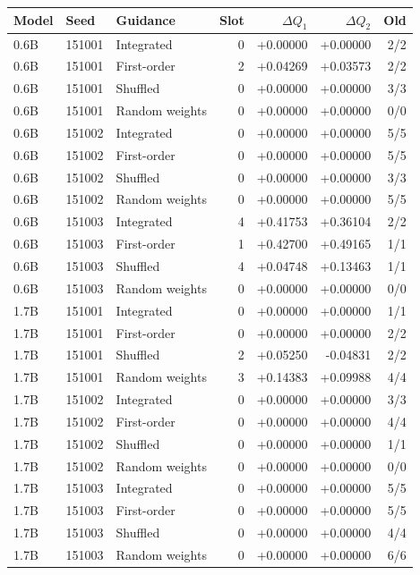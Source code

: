 \begin{tabular}{lllrrrr}
\toprule
Model & Seed & Guidance & Slot & $\Delta Q_1$ & $\Delta Q_2$ & Old \\
\midrule
0.6B & 151001 & Integrated & 0 & +0.00000 & +0.00000 & 2/2 \\
0.6B & 151001 & First-order & 2 & +0.04269 & +0.03573 & 2/2 \\
0.6B & 151001 & Shuffled & 0 & +0.00000 & +0.00000 & 3/3 \\
0.6B & 151001 & Random weights & 0 & +0.00000 & +0.00000 & 0/0 \\
0.6B & 151002 & Integrated & 0 & +0.00000 & +0.00000 & 5/5 \\
0.6B & 151002 & First-order & 0 & +0.00000 & +0.00000 & 5/5 \\
0.6B & 151002 & Shuffled & 0 & +0.00000 & +0.00000 & 3/3 \\
0.6B & 151002 & Random weights & 0 & +0.00000 & +0.00000 & 5/5 \\
0.6B & 151003 & Integrated & 4 & +0.41753 & +0.36104 & 2/2 \\
0.6B & 151003 & First-order & 1 & +0.42700 & +0.49165 & 1/1 \\
0.6B & 151003 & Shuffled & 4 & +0.04748 & +0.13463 & 1/1 \\
0.6B & 151003 & Random weights & 0 & +0.00000 & +0.00000 & 0/0 \\
1.7B & 151001 & Integrated & 0 & +0.00000 & +0.00000 & 1/1 \\
1.7B & 151001 & First-order & 0 & +0.00000 & +0.00000 & 2/2 \\
1.7B & 151001 & Shuffled & 2 & +0.05250 & -0.04831 & 2/2 \\
1.7B & 151001 & Random weights & 3 & +0.14383 & +0.09988 & 4/4 \\
1.7B & 151002 & Integrated & 0 & +0.00000 & +0.00000 & 3/3 \\
1.7B & 151002 & First-order & 0 & +0.00000 & +0.00000 & 4/4 \\
1.7B & 151002 & Shuffled & 0 & +0.00000 & +0.00000 & 1/1 \\
1.7B & 151002 & Random weights & 0 & +0.00000 & +0.00000 & 0/0 \\
1.7B & 151003 & Integrated & 0 & +0.00000 & +0.00000 & 5/5 \\
1.7B & 151003 & First-order & 0 & +0.00000 & +0.00000 & 5/5 \\
1.7B & 151003 & Shuffled & 0 & +0.00000 & +0.00000 & 4/4 \\
1.7B & 151003 & Random weights & 0 & +0.00000 & +0.00000 & 6/6 \\
\bottomrule
\end{tabular}
